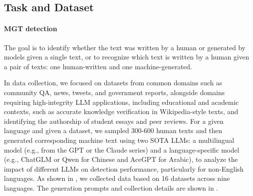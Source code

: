 


\subsection{Task and Dataset}

\paragraph{MGT detection} The goal is to identify whether the text was written by a human or generated by models given a single text, or to recognize which text is written by a human given a pair of texts: one human-written and one machine-generated.

In data collection, we focused on datasets from common domains such as community QA, news, tweets, and government reports, alongside domains requiring high-integrity LLM applications, including educational and academic contexts, such as accurate knowledge verification in Wikipedia-style texts, and identifying the authorship of student essays and peer reviews. 
For a given language and given a dataset, we sampled 300-600 human texts and then generated corresponding machine text using two SOTA LLMs: a multilingual model (e.g., from the GPT or the Claude series) and a language-specific model (e.g., ChatGLM or Qwen for Chinese and AceGPT for Arabic), to analyze the impact of different LLMs on detection performance, particularly for non-English languages.
% 
As shown in , we collected data based on 16 datasets across nine languages. The generation prompts and collection details are shown in . %

